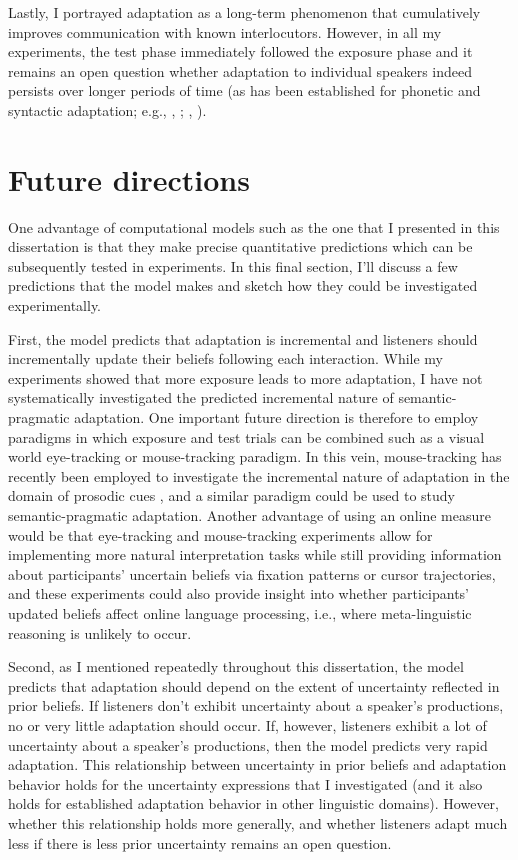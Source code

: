 Lastly, I portrayed adaptation as a long-term phenomenon that cumulatively improves communication with known interlocutors.
However, in all my experiments, the test phase immediately followed the exposure phase and it remains an open question
whether adaptation to individual speakers indeed persists over longer periods of time (as has been established for phonetic and syntactic
adaptation; e.g., \citeauthor{Xie2018}, \citeyear{Xie2018}; \citeauthor{Kroczek2017}, \citeyear{Kroczek2017}).

\section{Future directions}

One advantage of computational models such as the one that I presented in this dissertation is that they make precise quantitative predictions which can
be subsequently tested in experiments. In this final section, I'll discuss a few predictions that the model makes and sketch how they could be investigated experimentally.

First, the model predicts that adaptation is incremental and listeners should incrementally update their beliefs following each interaction. While my experiments showed that more exposure leads to more adaptation, I have not systematically investigated the predicted incremental nature of semantic-pragmatic adaptation. One important future direction is therefore to employ paradigms in which exposure and test trials can be combined such as a visual world eye-tracking or mouse-tracking paradigm.  In this vein, mouse-tracking has recently been
employed  to investigate the incremental nature of adaptation in the domain of  prosodic cues \cite{Roettger2019}, and a similar paradigm could be used to study semantic-pragmatic adaptation. Another advantage of using an online measure would be that eye-tracking and mouse-tracking experiments allow for 
implementing more natural interpretation tasks while still providing information about participants' uncertain beliefs via fixation patterns or cursor trajectories,
and these experiments could also provide insight into whether participants' updated beliefs affect online language processing, i.e., where meta-linguistic reasoning is unlikely to occur.

Second, as I mentioned repeatedly throughout this dissertation, the model predicts that adaptation should depend on the extent of uncertainty reflected in prior beliefs. If listeners don't exhibit uncertainty about a speaker's productions, no or very little adaptation should occur. If, however, listeners exhibit a lot of uncertainty about a speaker's productions, then the model predicts
very rapid adaptation. This relationship between uncertainty in prior beliefs and adaptation behavior holds for the uncertainty expressions that I investigated (and it also holds for established adaptation behavior in other linguistic domains). However, whether this relationship holds more generally, and whether listeners adapt much less if there is less prior uncertainty remains an open question. 

